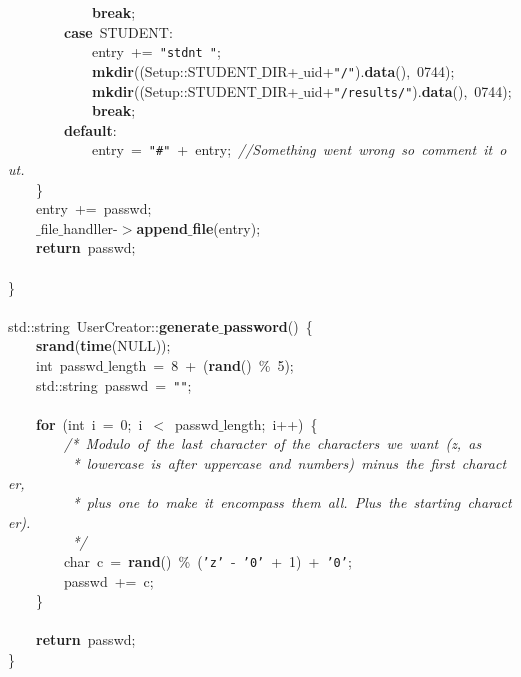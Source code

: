 \mbox{}\ \ \ \ \ \ \ \ \ \ \ \ \textbf{break}; \\
\mbox{}\ \ \ \ \ \ \ \ \textbf{case}\ STUDENT: \\
\mbox{}\ \ \ \ \ \ \ \ \ \ \ \ entry\ +=\ \texttt{"{}stdnt\ "{}}; \\
\mbox{}\ \ \ \ \ \ \ \ \ \ \ \ \textbf{mkdir}((Setup::STUDENT$\_$DIR+$\_$uid+\texttt{"{}/"{}}).\textbf{data}(),\ 0744); \\
\mbox{}\ \ \ \ \ \ \ \ \ \ \ \ \textbf{mkdir}((Setup::STUDENT$\_$DIR+$\_$uid+\texttt{"{}/results/"{}}).\textbf{data}(),\ 0744); \\
\mbox{}\ \ \ \ \ \ \ \ \ \ \ \ \textbf{break}; \\
\mbox{}\ \ \ \ \ \ \ \ \textbf{default}: \\
\mbox{}\ \ \ \ \ \ \ \ \ \ \ \ entry\ =\ \texttt{"{}\#"{}}\ +\ entry;\ \textit{//Something\ went\ wrong\ so\ comment\ it\ out.} \\
\mbox{}\ \ \ \ \} \\
\mbox{}\ \ \ \ entry\ +=\ passwd; \\
\mbox{}\ \ \ \ $\_$file$\_$handller-$>$\textbf{append$\_$file}(entry); \\
\mbox{}\ \ \ \ \textbf{return}\ passwd; \\
\mbox{} \\
\mbox{}\} \\
\mbox{} \\
\mbox{}std::string\ UserCreator::\textbf{generate$\_$password}()\ \{ \\
\mbox{}\ \ \ \ \textbf{srand}(\textbf{time}(NULL)); \\
\mbox{}\ \ \ \ int\ passwd$\_$length\ =\ 8\ +\ (\textbf{rand}()\ \%\ 5); \\
\mbox{}\ \ \ \ std::string\ passwd\ =\ \texttt{"{}"{}}; \\
\mbox{} \\
\mbox{}\ \ \ \ \textbf{for}\ (int\ i\ =\ 0;\ i\ $<$\ passwd$\_$length;\ i++)\ \{ \\
\mbox{}\ \ \ \ \ \ \ \ \textit{/*\ Modulo\ of\ the\ last\ character\ of\ the\ characters\ we\ want\ (z,\ as} \\
\mbox{}\textit{\ \ \ \ \ \ \ \ \ *\ lowercase\ is\ after\ uppercase\ and\ numbers)\ minus\ the\ first\ character,} \\
\mbox{}\textit{\ \ \ \ \ \ \ \ \ *\ plus\ one\ to\ make\ it\ encompass\ them\ all.\ Plus\ the\ starting\ character).} \\
\mbox{}\textit{\ \ \ \ \ \ \ \ \ */} \\
\mbox{}\ \ \ \ \ \ \ \ char\ c\ =\ \textbf{rand}()\ \%\ (\texttt{'z'}\ -\ \texttt{'0'}\ +\ 1)\ +\ \texttt{'0'}; \\
\mbox{}\ \ \ \ \ \ \ \ passwd\ +=\ c; \\
\mbox{}\ \ \ \ \} \\
\mbox{} \\
\mbox{}\ \ \ \ \textbf{return}\ passwd; \\
\mbox{}\} \\

